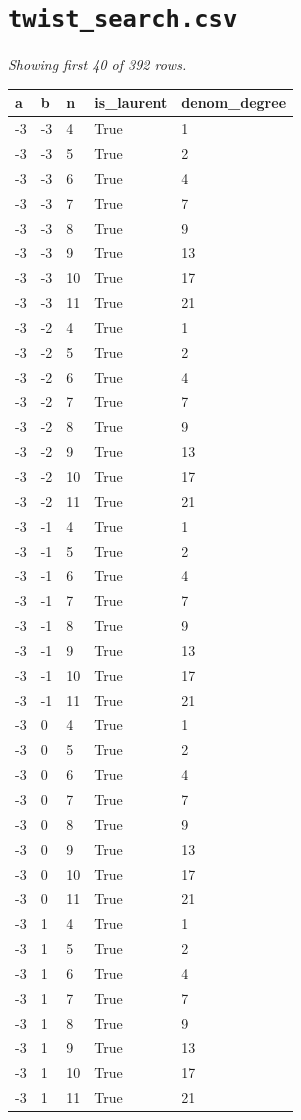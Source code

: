 \documentclass[10pt]{article}
\begin{document}
\section*{\texttt{twist\_search.csv}}
\noindent\textit{Showing first 40 of 392 rows.}\par\medskip
{\footnotesize
\begin{longtable}{@{}lllll@{}}
\toprule
\textbf{a} & \textbf{b} & \textbf{n} & \textbf{is\_laurent} & \textbf{denom\_degree} \\
\midrule\endhead
-3 & -3 & 4 & True & 1 \\
-3 & -3 & 5 & True & 2 \\
-3 & -3 & 6 & True & 4 \\
-3 & -3 & 7 & True & 7 \\
-3 & -3 & 8 & True & 9 \\
-3 & -3 & 9 & True & 13 \\
-3 & -3 & 10 & True & 17 \\
-3 & -3 & 11 & True & 21 \\
-3 & -2 & 4 & True & 1 \\
-3 & -2 & 5 & True & 2 \\
-3 & -2 & 6 & True & 4 \\
-3 & -2 & 7 & True & 7 \\
-3 & -2 & 8 & True & 9 \\
-3 & -2 & 9 & True & 13 \\
-3 & -2 & 10 & True & 17 \\
-3 & -2 & 11 & True & 21 \\
-3 & -1 & 4 & True & 1 \\
-3 & -1 & 5 & True & 2 \\
-3 & -1 & 6 & True & 4 \\
-3 & -1 & 7 & True & 7 \\
-3 & -1 & 8 & True & 9 \\
-3 & -1 & 9 & True & 13 \\
-3 & -1 & 10 & True & 17 \\
-3 & -1 & 11 & True & 21 \\
-3 & 0 & 4 & True & 1 \\
-3 & 0 & 5 & True & 2 \\
-3 & 0 & 6 & True & 4 \\
-3 & 0 & 7 & True & 7 \\
-3 & 0 & 8 & True & 9 \\
-3 & 0 & 9 & True & 13 \\
-3 & 0 & 10 & True & 17 \\
-3 & 0 & 11 & True & 21 \\
-3 & 1 & 4 & True & 1 \\
-3 & 1 & 5 & True & 2 \\
-3 & 1 & 6 & True & 4 \\
-3 & 1 & 7 & True & 7 \\
-3 & 1 & 8 & True & 9 \\
-3 & 1 & 9 & True & 13 \\
-3 & 1 & 10 & True & 17 \\
-3 & 1 & 11 & True & 21 \\
\bottomrule
\end{longtable}}
\end{document}
